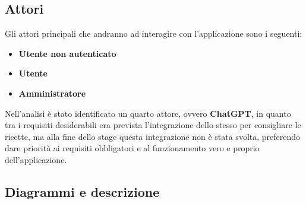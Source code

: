 \subsection{Attori}
Gli attori principali che andranno ad interagire con l'applicazione sono i seguenti:
\begin{itemize}
    \item \textbf{Utente non autenticato}
    \item \textbf{Utente}
    \item \textbf{Amministratore}
\end{itemize}
Nell'analisi è stato identificato un quarto attore, ovvero \textbf{ChatGPT}, in quanto tra i requisiti desiderabili era prevista l'integrazione dello stesso per consigliare le ricette, ma alla fine dello stage questa integrazione non è stata svolta, preferendo dare priorità ai requisiti obbligatori e al funzionamento vero e proprio dell'applicazione.

\newpage

\subsection{Diagrammi e descrizione}



